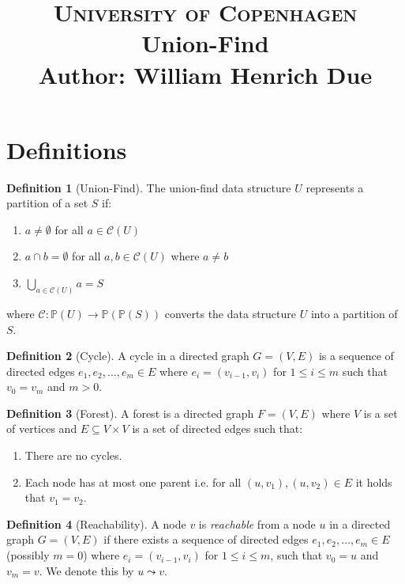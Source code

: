 \documentclass[a4paper,12pt]{article}
\title{
    {\Large \textsc{University of Copenhagen}} \\[5pt]
    {\large Union-Find} \\[10pt]
    Author: William Henrich Due \\[0pt]
}
\author{}
\date{}
\theoremstyle{definition}
\newtheorem{definition}{Definition}[section]
\begin{document}
\maketitle
\thispagestyle{firstpage}

\section{Definitions}

\begin{definition}[Union-Find]\label{def:union-find} The
    union-find data structure $U$ represents a partition of a set $S$ if:
    \begin{enumerate}
        \item $a \neq \emptyset$ for all $a \in \mathcal{C}(U)$
        \item $a \cap b = \emptyset$ for all $a, b \in \mathcal{C}(U)$ where $a
        \neq b$
        \item $\bigcup_{a \in \mathcal{C}(U)} a = S$
    \end{enumerate}
    where $\mathcal{C} : \mathbb{P}(U) \to \mathbb{P}(\mathbb{P}(S))$ converts
    the data structure $U$ into a partition of $S$.
\end{definition}

\begin{definition}[Cycle]
    A cycle in a directed graph $G = (V, E)$ is a sequence of directed edges
    $e_1, e_2, \ldots, e_m \in E$ where $e_i = (v_{i-1}, v_i)$ for $1 \leq i
    \leq m$ such that $v_0 = v_m$ and $m > 0$.
\end{definition}

\begin{definition}[Forest]
    A forest is a directed graph $F = (V, E)$ where $V$ is a set of vertices and $E
    \subseteq V \times V$ is a set of directed edges such that:
    \begin{enumerate}
        \item There are no cycles.
        \item Each node has at most one parent i.e. for all $(u, v_1), (u, v_2) \in E$ it
        holds that $v_1 = v_2$.
    \end{enumerate}
\end{definition}

\begin{definition}[Reachability]
    A node $v$ is \emph{reachable} from a node $u$ in a directed graph $G = (V,
    E)$ if there exists a sequence of directed edges $e_1, e_2, \ldots, e_m \in
    E$ (possibly $m = 0$) where $e_i = (v_{i-1}, v_i)$ for $1 \leq i \leq m$,
    such that $v_0 = u$ and $v_m = v$. We denote this by $u \leadsto v$.
\end{definition}
\end{document}
